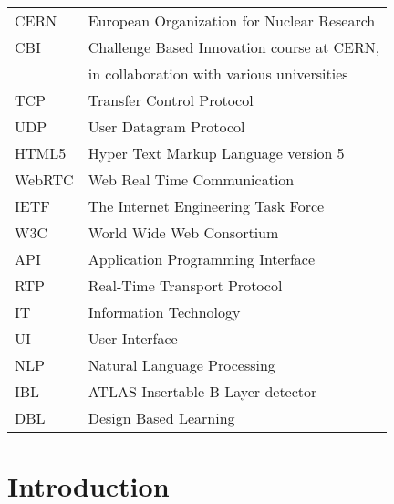 \documentclass[english,12pt,a4paper,dvips]{article}
\begin{document}
\begin{tabular}{ll}
CERN        & European Organization for Nuclear Research \\
CBI         & Challenge Based Innovation course at CERN,\\
            & in collaboration with various universities \\
TCP         & Transfer Control Protocol \\ %
UDP         & User Datagram Protocol \\
HTML5       & Hyper Text Markup Language version 5 \\
WebRTC      & Web Real Time Communication \\
IETF        & The Internet Engineering Task Force \\
W3C         & World Wide Web Consortium \\
API         & Application Programming Interface \\
RTP         & Real-Time Transport Protocol \\
IT          & Information Technology \\
UI          & User Interface \\
NLP         & Natural Language Processing \\
IBL         & ATLAS Insertable B-Layer detector \\
DBL         & Design Based Learning 
\end{tabular}


\cleardoublepage
\storeinipagenumber
{}
\setcounter{page}{1}


\section{Introduction}
\end{document}
